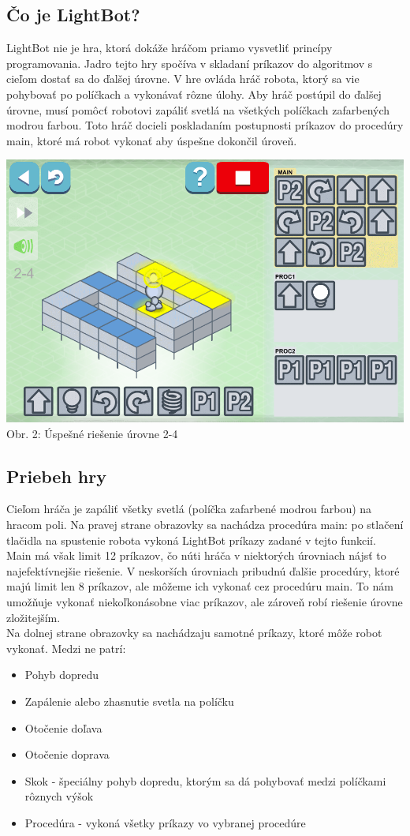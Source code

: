 \documentclass[slovak,a4paper,11pt]{article}
\begin{document}
\subsection{Čo je LightBot?}
LightBot nie je hra, ktorá dokáže hráčom priamo vysvetliť princípy programovania. Jadro tejto hry spočíva v skladaní príkazov do algoritmov s cieľom dostať sa do ďalšej úrovne. V hre ovláda hráč robota, ktorý sa vie pohybovať po políčkach a vykonávať rôzne úlohy. Aby hráč postúpil do ďalšej úrovne, musí pomôcť robotovi zapáliť svetlá na všetkých políčkach zafarbených modrou farbou. Toto hráč docieli poskladaním postupnosti príkazov do procedúry main, ktoré má robot vykonať aby úspešne dokončil úroveň. \\
\begin{center}
\includegraphics[scale=0.3]{lightbotmain}
\\ Obr. 2: Úspešné riešenie úrovne 2-4
\end{center}
\subsection{Priebeh hry}
Cieľom hráča je zapáliť všetky svetlá (políčka zafarbené modrou farbou) na hracom poli. Na pravej strane obrazovky sa nachádza procedúra main: po stlačení tlačidla na spustenie robota vykoná LightBot príkazy zadané v tejto funkcií. Main má však limit 12 príkazov, čo núti hráča v niektorých úrovniach nájsť to najefektívnejšie riešenie. V neskorších úrovniach pribudnú ďalšie procedúry, ktoré majú limit len 8 príkazov, ale môžeme ich vykonať cez procedúru main. To nám umožňuje vykonať niekoľkonásobne viac príkazov, ale zároveň robí riešenie úrovne zložitejším. \\
Na dolnej strane obrazovky sa nachádzaju samotné príkazy, ktoré môže robot vykonať. Medzi ne patrí:
\begin{itemize}
\item Pohyb dopredu
\item Zapálenie alebo zhasnutie svetla na políčku
\item Otočenie doľava
\item Otočenie doprava
\item Skok - špeciálny pohyb dopredu, ktorým sa dá pohybovať medzi políčkami rôznych výšok
\item Procedúra - vykoná všetky príkazy vo vybranej procedúre
\end{itemize}
\end{document}
